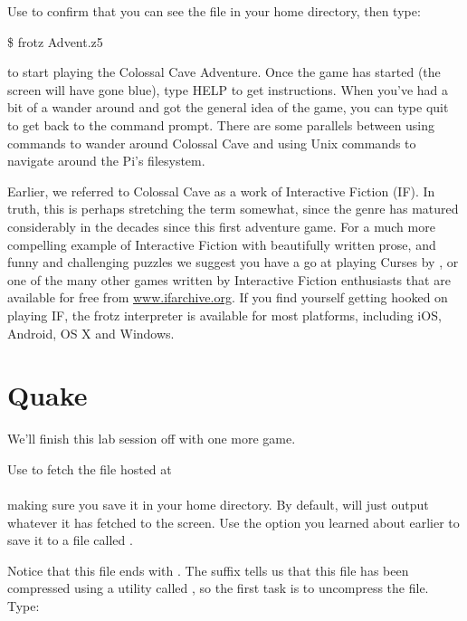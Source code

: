 Use  to confirm that you can see the file  in your home directory, then type:

\begin{ttoutenv}
\$ frotz Advent.z5
\end{ttoutenv}

\noindent to start playing the Colossal Cave Adventure. Once the game has started (the screen will have gone blue), type HELP to get instructions. When you've had a bit of a wander around and got the general idea of the game, you can type quit to get back to the command prompt. There are some parallels between using commands to wander around Colossal Cave and using Unix commands to navigate around the Pi's filesystem.

Earlier, we referred to Colossal Cave as a work of Interactive Fiction (IF). In truth, this is perhaps stretching the term somewhat, since the genre has matured considerably in the decades since this first adventure game. For a much more compelling example of Interactive Fiction with beautifully written prose, and funny and challenging puzzles we suggest you have a go at playing Curses by , or one of the many other games written by Interactive Fiction enthusiasts that are available for free from \url{www.ifarchive.org}. If you find yourself getting hooked on playing IF, the frotz interpreter is available for most platforms, including iOS, Android, OS X and Windows.

\section{Quake}

We'll finish this lab session off with one more game.

Use  to fetch the file hosted at
\\
\\
making sure you save it in your home directory. By default,  will just output whatever it has fetched to the screen. Use the option you learned about earlier to save it to a file called .

Notice that this file ends with . The  suffix tells us that this file has been compressed using a utility called , so the first task is to uncompress the file. Type:


